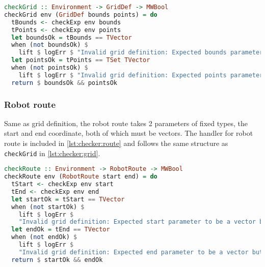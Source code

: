 \begin{lstlisting}[language=haskell,
caption={Handler for grid definition},
label=lst:checker:grid]
checkGrid :: Environment -> GridDef -> MWBool
checkGrid env (GridDef bounds points) = do
  tBounds <- checkExp env bounds
  tPoints <- checkExp env points
  let boundsOk = tBounds == TVector
  when (not boundsOk) $
    lift $ logErr $ "Invalid grid definition: Expected bounds parameter to be a vector but was " <> (show tBounds)
  let pointsOk = tPoints == TSet TVector
  when (not pointsOk) $
    lift $ logErr $ "Invalid grid definition: Expected points parameter to be a vector set but was " <> (show tPoints)
  return $ boundsOk && pointsOk
\end{lstlisting}

\subsubsection{Robot route}
Same as grid definition, the robot route takes 2 parameters of fixed types, the start and end coordinate, both of which must be vectors. The handler for robot route is included in \cref{lst:checker:route} and follows the same structure as \lstinline{checkGrid} in \cref{lst:checker:grid}.
\begin{lstlisting}[language=haskell,
caption={Handler for robot route},
label=lst:checker:route]
checkRoute :: Environment -> RobotRoute -> MWBool
checkRoute env (RobotRoute start end) = do
  tStart <- checkExp env start
  tEnd <- checkExp env end
  let startOk = tStart == TVector
  when (not startOk) $
    lift $ logErr $
    "Invalid grid definition: Expected start parameter to be a vector but was " <> (show tStart)
  let endOk = tEnd == TVector
  when (not endOk) $
    lift $ logErr $
    "Invalid grid definition: Expected end parameter to be a vector but was " <> (show tEnd)
  return $ startOk && endOk
\end{lstlisting}

\clearpage